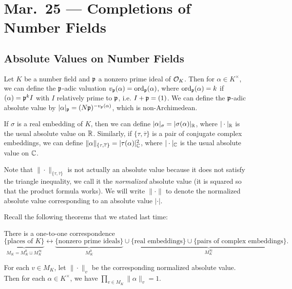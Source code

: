 \chapter{Mar.~25 --- Completions of Number Fields}

\section{Absolute Values on Number Fields}
\begin{remark}
  Let $K$ be a number field and $\mathfrak{p}$ a nonzero
  prime ideal of $\mathcal{O}_K$. Then for $\alpha \in K^\times$,
  we can define the $\mathfrak{p}$-adic valuation
  $v_{\mathfrak{p}}(\alpha) = \operatorname{ord}_{\mathfrak{p}}(\alpha)$, where
  $\operatorname{ord}_{\mathfrak{p}}(\alpha) = k$ if $(\alpha) = \mathfrak{p}^k I$ with
  $I$ relatively prime to $\mathfrak{p}$, i.e. $I + \mathfrak{p} = (1)$.
  We can define the $\mathfrak{p}$-adic absolute value
  by $|\alpha|_{\mathfrak{p}} = (N\mathfrak{p})^{-v_{\mathfrak{p}}(\alpha)}$, which is
  non-Archimedean.

  If $\sigma$ is a real embedding
  of $K$, then we can define $|\alpha|_\sigma = |\sigma(\alpha)|_{\mathbb{R}}$,
  where $|\cdot|_{\mathbb{R}}$ is the usual absolute value on
  $\mathbb{R}$. Similarly, if $\{\tau, \overline{\tau}\}$
  is a pair of conjugate complex embeddings, we
  can define $\|\alpha\|_{\{\tau, \overline{\tau}\}} = |\tau(\alpha)|^2_{\mathbb{C}}$,
  where $|\cdot|_{\mathbb{C}}$ is the usual absolute value on
  $\mathbb{C}$.

  Note that $\| \cdot \|_{\{\tau, \overline{\tau}\}}$
  is not actually an absolute value because
  it does not satisfy the triangle inequality,
  we call it the \emph{normalized} absolute value (it
  is squared so that the product formula works).
  We will write
  $\| \cdot \|$ to denote the normalized absolute
  value corresponding to an absolute value $|\cdot|$.

  Recall the following theorems that we stated last
  time:
\end{remark}

\begin{theorem}
  There is a one-to-one correspondence
  \[
    \underbrace{\{\text{places of $K$}\}}_{M_K = M_K^0 \sqcup M_K^\infty} \longleftrightarrow
    \underbrace{\{\text{nonzero prime ideals}\}}_{M_K^0}
    \cup \underbrace{\{\text{real embeddings}\}
    \cup \{\text{pairs of complex embeddings}\}}_{M_K^\infty}.
  \]
\end{theorem}

\begin{theorem}
  For each $v \in M_K$, let $\|\cdot\|_v$ be the
  corresponding normalized absolute value.
  Then for each $\alpha \in K^\times$, we have
  $\prod_{v \in M_K} \|\alpha\|_v = 1$.
\end{theorem}

